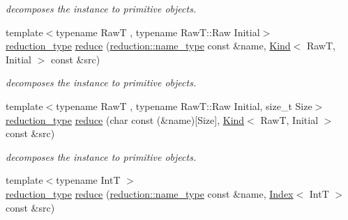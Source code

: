 \begin{DoxyCompactItemize}
\begin{DoxyCompactList}\small\item\em decomposes the instance to primitive objects. \end{DoxyCompactList}\item 
\hypertarget{namespacehryky_aa5bb140e64818a1ebfe12965b9a1e0a3}{{\footnotesize template$<$typename Raw\-T , typename Raw\-T\-::\-Raw Initial$>$ }\\\hyperlink{namespacehryky_a343a9a4c36a586be5c2693156200eadc}{reduction\-\_\-type} \hyperlink{namespacehryky_aa5bb140e64818a1ebfe12965b9a1e0a3}{reduce} (\hyperlink{namespacehryky_1_1reduction_ac686c30a4c8d196bbd0f05629a6b921f}{reduction\-::name\-\_\-type} const \&name, \hyperlink{classhryky_1_1_kind}{Kind}$<$ Raw\-T, Initial $>$ const \&src)}\label{namespacehryky_aa5bb140e64818a1ebfe12965b9a1e0a3}

\begin{DoxyCompactList}\small\item\em decomposes the instance to primitive objects. \end{DoxyCompactList}\item 
\hypertarget{namespacehryky_ae0562462283099b0d51a02a4012ccc56}{{\footnotesize template$<$typename Raw\-T , typename Raw\-T\-::\-Raw Initial, size\-\_\-t Size$>$ }\\\hyperlink{namespacehryky_a343a9a4c36a586be5c2693156200eadc}{reduction\-\_\-type} \hyperlink{namespacehryky_ae0562462283099b0d51a02a4012ccc56}{reduce} (char const (\&name)\mbox{[}Size\mbox{]}, \hyperlink{classhryky_1_1_kind}{Kind}$<$ Raw\-T, Initial $>$ const \&src)}\label{namespacehryky_ae0562462283099b0d51a02a4012ccc56}

\begin{DoxyCompactList}\small\item\em decomposes the instance to primitive objects. \end{DoxyCompactList}\item 
\hypertarget{namespacehryky_ae17580260ffa431c10c056a8b1c88282}{{\footnotesize template$<$typename Int\-T $>$ }\\\hyperlink{namespacehryky_a343a9a4c36a586be5c2693156200eadc}{reduction\-\_\-type} \hyperlink{namespacehryky_ae17580260ffa431c10c056a8b1c88282}{reduce} (\hyperlink{namespacehryky_1_1reduction_ac686c30a4c8d196bbd0f05629a6b921f}{reduction\-::name\-\_\-type} const \&name, \hyperlink{classhryky_1_1_index}{Index}$<$ Int\-T $>$ const \&src)}\label{namespacehryky_ae17580260ffa431c10c056a8b1c88282}


\end{DoxyCompactItemize}
